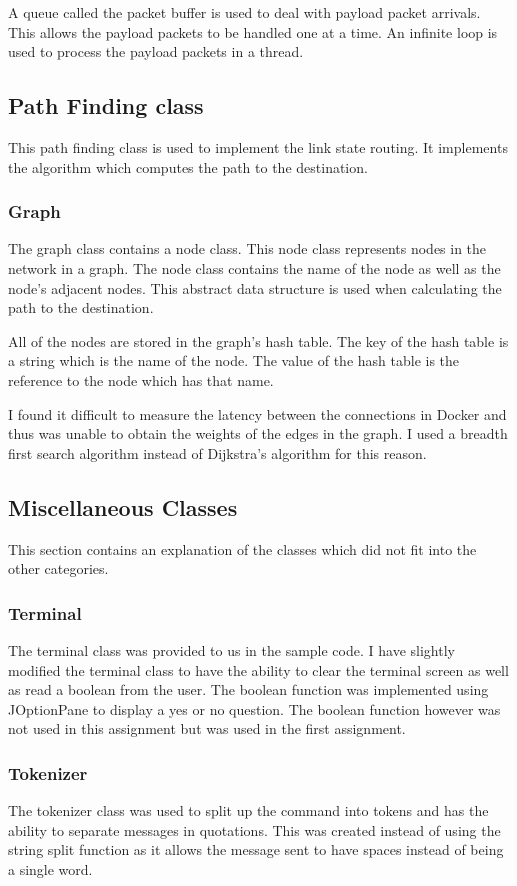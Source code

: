 \documentclass{article}
\begin{document}
A queue called the packet buffer is used to deal with payload packet arrivals.
This allows the payload packets to be handled one at a time.  An infinite loop
is used to process the payload packets in a thread.

\subsection{Path Finding class}
This path finding class is used to implement the link state routing. It
implements the algorithm which computes the path to the destination.

\subsubsection{Graph}
The graph class contains a node class. This node class represents nodes in the
network in a graph. The node class contains the name of the node as well as the
node's adjacent nodes. This abstract data structure is used when calculating the
path to the destination.

All of the nodes are stored in the graph's hash table. The key of the hash
table is a string which is the name of the node. The value of the hash table is
the reference to the node which has that name.

I found it difficult to measure the latency between the connections in Docker
and thus was unable to obtain the weights of the edges in the graph. I used a
breadth first search algorithm instead of Dijkstra's algorithm for this reason.

\subsection{Miscellaneous Classes}
This section contains an explanation of the classes which did not fit into the
other categories.

\subsubsection{Terminal}
The terminal class was provided to us in the sample code. I have slightly
modified the terminal class to have the ability to clear the terminal screen
as well as read a boolean from the user. The boolean function was implemented
using JOptionPane to display a yes or no question. The boolean function however
was not used in this assignment but was used in the first assignment.

\subsubsection{Tokenizer}
The tokenizer class was used to split up the command into tokens and has the
ability to separate messages in quotations. This was created instead of using
the string split function as it allows the message sent to have spaces instead
of being a single word.
\end{document}
